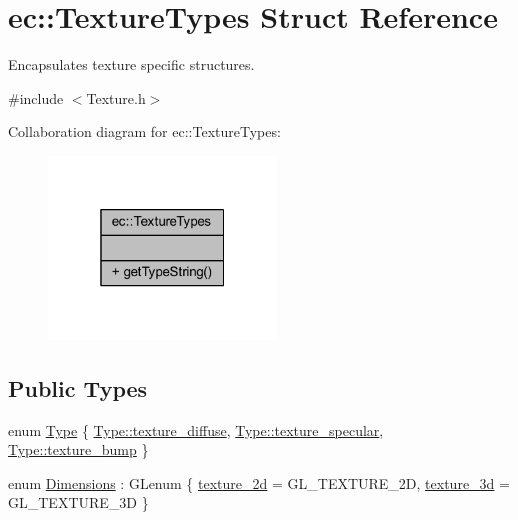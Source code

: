 \hypertarget{structec_1_1_texture_types}{}\section{ec\+:\+:Texture\+Types Struct Reference}
\label{structec_1_1_texture_types}


Encapsulates texture specific structures.  




{\ttfamily \#include $<$Texture.\+h$>$}



Collaboration diagram for ec\+:\+:Texture\+Types\+:\nopagebreak
\begin{figure}[H]
\begin{center}
\leavevmode
\includegraphics[width=172pt]{structec_1_1_texture_types__coll__graph}
\end{center}
\end{figure}
\subsection*{Public Types}
\begin{DoxyCompactItemize}
\item 
enum \mbox{\hyperlink{structec_1_1_texture_types_aff67825b98dd1edd7e4783350e866202}{Type}} \{ \mbox{\hyperlink{structec_1_1_texture_types_aff67825b98dd1edd7e4783350e866202a14537624b53e4f7ea1ed6da9d69689bd}{Type\+::texture\+\_\+diffuse}}, 
\mbox{\hyperlink{structec_1_1_texture_types_aff67825b98dd1edd7e4783350e866202a15de69baae1c21be50ddee302cc11949}{Type\+::texture\+\_\+specular}}, 
\mbox{\hyperlink{structec_1_1_texture_types_aff67825b98dd1edd7e4783350e866202a700e2ecc89c80e856d64e370ea3f13af}{Type\+::texture\+\_\+bump}}
 \}
\item 
enum \mbox{\hyperlink{structec_1_1_texture_types_ac0e07f24452fa28dd8e6e33a224842fc}{Dimensions}} \+: G\+Lenum \{ \mbox{\hyperlink{structec_1_1_texture_types_ac0e07f24452fa28dd8e6e33a224842fca13a163219b727876c389ffc248f28e04}{texture\+\_\+2d}} = G\+L\+\_\+\+T\+E\+X\+T\+U\+R\+E\+\_\+2D, 
\mbox{\hyperlink{structec_1_1_texture_types_ac0e07f24452fa28dd8e6e33a224842fcaf7383d5e217f8da43906166138a147ab}{texture\+\_\+3d}} = G\+L\+\_\+\+T\+E\+X\+T\+U\+R\+E\+\_\+3D
 \}
\end{DoxyCompactItemize}
